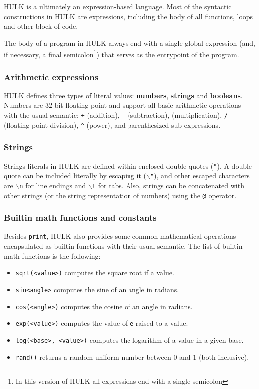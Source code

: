 \documentclass[a4paper, 12pt]{report}
\begin{document}
HULK is a ultimately an expression-based language. Most of the syntactic constructions in HULK are expressions,
including the body of all functions, loops and other block of code.

The body of a program in HULK always end with a single global expression (and, if necessary, a final semicolon\footnote{In this
  version of HULK all expressions end with a single semicolon}) that serves as the entrypoint of the program.

\subsubsection*{Arithmetic expressions}

HULK defines three types of literal values: {\bf numbers}, {\bf strings} and {\bf booleans}. Numbers are $32$-bit floating-point
and support all basic arithmetic operations with the usual semantic: {\tt +} (addition), {\tt -} (subtraction), {\tt *} (multiplication),
{\tt \slash} (floating-point division), {\tt \^{}} (power), and parenthesized sub-expressions.

\subsubsection*{Strings}

Strings literals in HULK are defined within enclosed double-quotes ({\tt "}). A double-quote
can be included literally by escaping it ($\backslash${\tt "}), and other escaped characters
are $\backslash${\tt n} for line endings and $\backslash${\tt t} for tabs. Also, strings can
be concatenated with other strings (or the string representation of numbers) using the {\tt @}
operator.

\subsubsection*{Builtin math functions and constants}

Besides {\tt print}, HULK also provides some common mathematical operations encapsulated as
builtin functions with their usual semantic. The list of builtin math functions is the following:

\begin{itemize}
  \item {\tt sqrt(<value>)} computes the square root if a value.
  \item {\tt sin{<angle>}} computes the sine of an angle in radians.
  \item {\tt cos(<angle>)} computes the cosine of an angle in radians.
  \item {\tt exp(<value>)} computes the value of {\tt e} raised to a value.
  \item {\tt log(<base>, <value>)} computes the logarithm of a value in a given base.
  \item {\tt rand()} returns a random uniform number between $0$ and $1$ (both inclusive).
\end{itemize}
\end{document}
